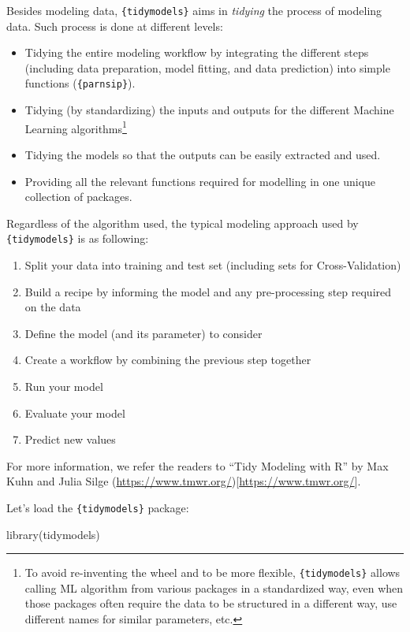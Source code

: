 \documentclass[
]{krantz}
\makeatletter
\newenvironment{Shaded}{\begin{snugshade}}{\end{snugshade}}
\newcommand{\FunctionTok}[1]{\textcolor[rgb]{0,0,0}{#1}}
\newcommand{\NormalTok}[1]{#1}
\providecommand{\tightlist}{%
  \setlength{\itemsep}{0pt}\setlength{\parskip}{0pt}}
\newenvironment{kframe}{%
\medskip{}
\setlength{\fboxsep}{.8em}
 \def\at@end@of@kframe{}%
 \ifinner\ifhmode%
  \def\at@end@of@kframe{\end{minipage}}%
  \begin{minipage}{\columnwidth}%
 \fi\fi%
 \def\FrameCommand##1{\hskip\@totalleftmargin \hskip-\fboxsep
 \colorbox{shadecolor}{##1}\hskip-\fboxsep
     \hskip-\linewidth \hskip-\@totalleftmargin \hskip\columnwidth}%
 \MakeFramed {\advance\hsize-\width
   \@totalleftmargin\z@ \linewidth\hsize
   \@setminipage}}%
 {\par\unskip\endMakeFramed%
 \at@end@of@kframe}
\renewenvironment{Shaded}{\begin{kframe}}{\end{kframe}}
\makeatother
\begin{document}
Besides modeling data, \texttt{\{tidymodels\}} aims in \emph{tidying} the process of modeling data. Such process is done at different levels:

\begin{itemize}
\tightlist
\item
  Tidying the entire modeling workflow by integrating the different steps (including data preparation, model fitting, and data prediction) into simple functions (\texttt{\{parnsip\}}).
\item
  Tidying (by standardizing) the inputs and outputs for the different Machine Learning algorithms\footnote{To avoid re-inventing the wheel and to be more flexible, \texttt{\{tidymodels\}} allows calling ML algorithm from various packages in a standardized way, even when those packages often require the data to be structured in a different way, use different names for similar parameters, etc.}
\item
  Tidying the models so that the outputs can be easily extracted and used.
\item
  Providing all the relevant functions required for modelling in one unique collection of packages.
\end{itemize}

Regardless of the algorithm used, the typical modeling approach used by \texttt{\{tidymodels\}} is as following:

\begin{enumerate}
\def\labelenumi{\arabic{enumi}.}
\tightlist
\item
  Split your data into training and test set (including sets for Cross-Validation)
\item
  Build a recipe by informing the model and any pre-processing step required on the data
\item
  Define the model (and its parameter) to consider
\item
  Create a workflow by combining the previous step together
\item
  Run your model
\item
  Evaluate your model
\item
  Predict new values
\end{enumerate}

For more information, we refer the readers to ``Tidy Modeling with R'' by Max Kuhn and Julia Silge (\url{https://www.tmwr.org/}){[}\url{https://www.tmwr.org/}{]}.

Let's load the \texttt{\{tidymodels\}} package:

\begin{Shaded}
\begin{Highlighting}[]
\FunctionTok{library}\NormalTok{(tidymodels)}
\end{Highlighting}
\end{Shaded}
\end{document}
